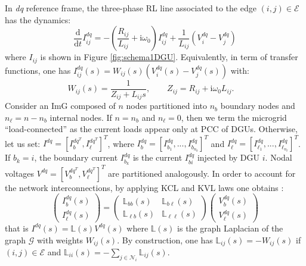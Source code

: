\documentclass[a4paper]{article}
\theoremstyle{plain}
\def\Lset{\mathbb{L}}
\newcommand{\GG}{{\mathcal G}}
\begin{document}
In \emph{dq} reference frame, the three-phase RL line associated to the edge $(i,j)\in \mathcal E$ has the dynamics:
    \begin{equation*}
    \frac{\mathrm d}{\mathrm dt}I_{ij}^{dq}=-\left( \frac{R_{ij}}{L_{ij}}+\mathrm i \omega_0 \right) I_{ij}^{dq} + \frac{1}{L_{ij}}\left( V_i^{dq}-V_j^{dq}\right) 
    \end{equation*}
    where $I_{ij}$ is shown in Figure \ref{fig:schema1DGU}. Equivalently, in term of transfer functions, one has $I_{ij}^{dq}(s)=W_{ij}(s)\left( V_i^{dq}(s)-V_j^{dq}(s) \right)$ with:
    \begin{equation}
    W_{ij}(s)=\frac{1}{Z_{ij}+L_{ij}s}, \qquad Z_{ij}=R_{ij}+\mathrm i \omega_0 L_{ij}.\quad
    \label{ConstitutiveRel}
    \end{equation}
Consider an ImG composed of $n$ nodes partitioned into $n_b$ boundary nodes and $n_{\ell} = n-n_b$ internal nodes. If $n=n_b$ and $n_{\ell}=0$, then we term the microgrid ``load-connected'' as the current loads appear only at PCC of DGUs. Otherwise, let us set: $I^{dq}=\left[I_{b}^{dq^T}, I_{\ell}^{dq^T}\right]^T$, where $I_b^{dq}=\left[I_{b_1}^{dq}, ..., I_{b_{n_b}}^{dq} \right]^T $ and $I_{\ell}^{dq}=\left[ I_{\ell_1}^{dq}, ..., I_{\ell_{n_{\ell}}}^{dq} \right]^T$. If $b_k =i$, the boundary current $I_{b_k}^{dq}$ is the current $I_{bi}^{dq}$ injected by DGU $i$. Nodal voltages $V^{dq}=\left[ V_b^{dq^T}, V_{\ell}^{dq^T}\right]^T$
are partitioned analogously. In order to account for the network interconnections, by applying KCL and KVL laws one obtains \cite{dhople2014synchronization}:
    \begin{equation}
    \begin{pmatrix}
    I_b^{dq}(s)\\ I_{\ell}^{dq}(s)
    \end{pmatrix}=
    \begin{pmatrix}
    \Lset_{bb}(s) & \Lset_{b\ell}(s)\\ \Lset_{\ell b}(s) & \Lset_{\ell \ell}(s)
    \end{pmatrix}
    \begin{pmatrix}
    V_{b}^{dq}(s)\\ V_{\ell}^{dq}(s)
    \end{pmatrix}
    \label{I=LV}
    \end{equation}
    that is $I^{dq}(s)=\Lset(s) V^{dq}(s)$ where $\Lset(s)$ is the graph Laplacian of the graph $\GG$ with weights $W_{ij}(s)$. By construction, one has $\Lset_{ij}(s)=-W_{ij}(s)$ if $(i,j)\in \mathcal E$ and $\Lset_{ii}(s)=-\sum_{j\in \mathcal N_i}{\Lset_{ij}(s)}$. 
\end{document}
